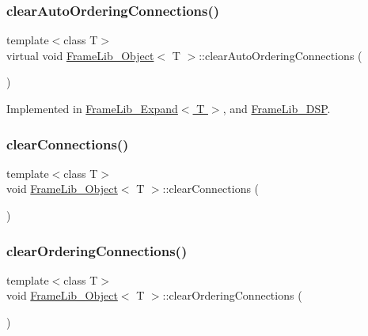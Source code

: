 \subsubsection{\texorpdfstring{clear\+Auto\+Ordering\+Connections()}{clearAutoOrderingConnections()}}
{\footnotesize\ttfamily template$<$class T$>$ \\
virtual void \hyperlink{class_frame_lib___object}{Frame\+Lib\+\_\+\+Object}$<$ T $>$\+::clear\+Auto\+Ordering\+Connections (\begin{DoxyParamCaption}{ }\end{DoxyParamCaption})\hspace{0.3cm}{\ttfamily [pure virtual]}}



Implemented in \hyperlink{class_frame_lib___expand_a1fc74f5aa29990019307078693016f78}{Frame\+Lib\+\_\+\+Expand$<$ T $>$}, and \hyperlink{class_frame_lib___d_s_p_a8c9843103d691ed57e3e265528f575be}{Frame\+Lib\+\_\+\+D\+SP}.

\mbox{\label{class_frame_lib___object_a4fa6add369fd21ddc5250efd740d0285}} 
\subsubsection{\texorpdfstring{clear\+Connections()}{clearConnections()}}
{\footnotesize\ttfamily template$<$class T$>$ \\
void \hyperlink{class_frame_lib___object}{Frame\+Lib\+\_\+\+Object}$<$ T $>$\+::clear\+Connections (\begin{DoxyParamCaption}{ }\end{DoxyParamCaption})\hspace{0.3cm}{\ttfamily [inline]}}

\mbox{\label{class_frame_lib___object_abd548d2e3899a1a8738a71b3824ac039}} 
\subsubsection{\texorpdfstring{clear\+Ordering\+Connections()}{clearOrderingConnections()}}
{\footnotesize\ttfamily template$<$class T$>$ \\
void \hyperlink{class_frame_lib___object}{Frame\+Lib\+\_\+\+Object}$<$ T $>$\+::clear\+Ordering\+Connections (\begin{DoxyParamCaption}{ }\end{DoxyParamCaption})\hspace{0.3cm}{\ttfamily [inline]}}

